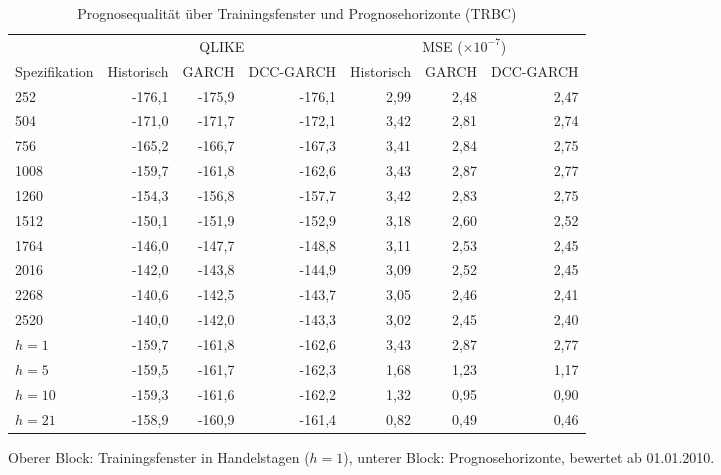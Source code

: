 \begin{table}[htbp]
  \centering
  \footnotesize
  \begin{tabular}{lrrrrrr}
    \toprule
    & \multicolumn{3}{c}{QLIKE} & \multicolumn{3}{c}{MSE ($\times 10^{-7}$)} \\
    \cmidrule(lr){2-4}\cmidrule(lr){5-7}
    Spezifikation & Historisch & GARCH & DCC-GARCH & Historisch & GARCH & DCC-GARCH \\
    \midrule
    252 & -176,1 & -175,9 & -176,1 & 2,99 & 2,48 & 2,47 \\
    504 & -171,0 & -171,7 & -172,1 & 3,42 & 2,81 & 2,74 \\
    756 & -165,2 & -166,7 & -167,3 & 3,41 & 2,84 & 2,75 \\
    1008 & -159,7 & -161,8 & -162,6 & 3,43 & 2,87 & 2,77 \\
    1260 & -154,3 & -156,8 & -157,7 & 3,42 & 2,83 & 2,75 \\
    1512 & -150,1 & -151,9 & -152,9 & 3,18 & 2,60 & 2,52 \\
    1764 & -146,0 & -147,7 & -148,8 & 3,11 & 2,53 & 2,45 \\
    2016 & -142,0 & -143,8 & -144,9 & 3,09 & 2,52 & 2,45 \\
    2268 & -140,6 & -142,5 & -143,7 & 3,05 & 2,46 & 2,41 \\
    2520 & -140,0 & -142,0 & -143,3 & 3,02 & 2,45 & 2,40 \\
    \midrule
    $h=1$ & -159,7 & -161,8 & -162,6 & 3,43 & 2,87 & 2,77 \\
    $h=5$ & -159,5 & -161,7 & -162,3 & 1,68 & 1,23 & 1,17 \\
    $h=10$ & -159,3 & -161,6 & -162,2 & 1,32 & 0,95 & 0,90 \\
    $h=21$ & -158,9 & -160,9 & -161,4 & 0,82 & 0,49 & 0,46 \\
    \bottomrule
  \end{tabular}
  \caption{Prognosequalität über Trainingsfenster und Prognosehorizonte (TRBC)}
  \label{tab:qlike_grid}
  \begin{minipage}{\linewidth}\vspace{0.4em}\centering\footnotesize
  Oberer Block: Trainingsfenster in Handelstagen ($h=1$), unterer Block: Prognosehorizonte, bewertet ab 01.01.2010.
  \end{minipage}
\end{table}
